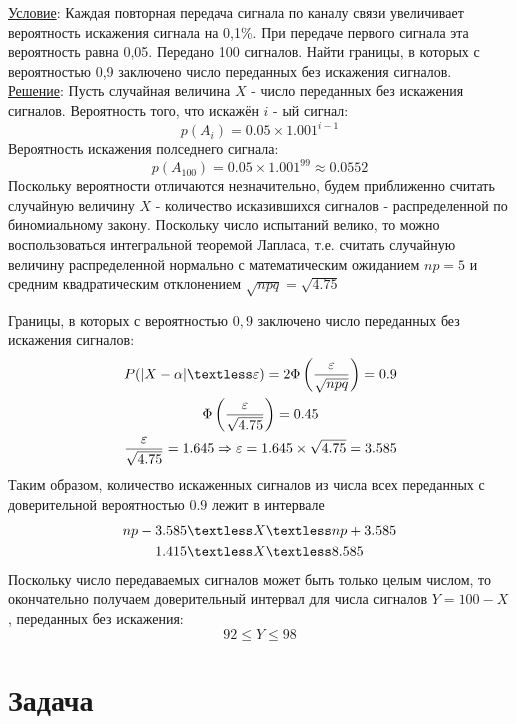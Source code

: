 \documentclass[a4paper,12pt]{article} %
\begin{document}
\underline{Условие}: Каждая повторная передача сигнала по каналу связи увеличивает
вероятность искажения сигнала на 0,1\%. При передаче первого сигнала эта
вероятность равна 0,05. Передано 100 сигналов. Найти границы, в которых с
вероятностью 0,9 заключено число переданных без искажения сигналов.\\
\underline{Решение}: Пусть случайная величина $X$ - число переданных без искажения сигналов. Вероятность того, что искажён $i$ - ый сигнал:
\[
	p(A_i) = 0.05\times 1.001^{i-1}
\]
Вероятность искажения полседнего сигнала:
\[
	p(A_{100}) = 0.05\times 1.001^{99}\approx 0.0552
\]
Поскольку вероятности отличаются незначительно, будем приближенно считать случайную величину $X$ - количество
исказившихся сигналов - распределенной по биномиальному закону. Поскольку число испытаний велико,
то можно воспользоваться интегральной теоремой Лапласа, т.е. считать случайную величину
распределенной нормально с математическим ожиданием $np = 5$ и средним
квадратическим отклонением $\sqrt{npq} = \sqrt{4.75}$

Границы, в которых с вероятностью $0,9$ заключено число переданных без искажения сигналов:
\begin{gather}
	P(|X-\alpha|\textless\varepsilon) = 2\Phi\left(\dfrac{\varepsilon}{\sqrt{npq}}\right) = 0.9\\
	\Phi\left(\dfrac{\varepsilon}{\sqrt{4.75}}\right) = 0.45\\
	\dfrac{\varepsilon}{\sqrt{4.75}} = 1.645 \Rightarrow\varepsilon = 1.645\times\sqrt{4.75} = 3.585
\end{gather}
Таким образом, количество искаженных сигналов из числа всех переданных с доверительной вероятностью $0.9$
лежит в интервале
\begin{align}
	np - 3.585 \textless &X \textless np + 3.585\\
	1.415 \textless &X \textless 8.585
\end{align}
Поскольку число передаваемых сигналов может быть только целым числом, то окончательно получаем
доверительный интервал для числа сигналов $Y = 100 - X$, переданных без искажения:
\[
	92 \leqslant Y \leqslant 98
\]

\section{Задача}
\end{document}
